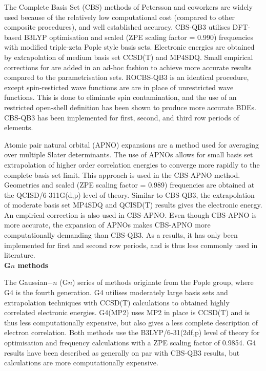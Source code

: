 The Complete Basis Set (CBS) methods of Petersson and coworkers\cite{Montgomery1999, Montgomery2000, Ochterski1996, Wood2006} are widely used because of the relatively low computational cost (compared to other composite procedures), and well established accuracy.\cite{Somers2015, Simmie2015} CBS-QB3\cite{Montgomery1999, Montgomery2000} utilises DFT-based B3LYP optimisation and scaled (ZPE scaling factor = 0.990) frequencies with modified triple-zeta Pople style basis sets. Electronic energies are obtained by extrapolation of medium basis set CCSD(T) and MP4SDQ. Small empirical corrections for are added in an ad-hoc fashion to achieve more accurate results compared to the parametrisation sets.\cite{Petersson2001} ROCBS-QB3 is an identical procedure, except spin-resticted wave functions are are in place of unrestricted wave functions. This is done to eliminate spin contamination, and the use of an restricted open-shell definition has been shown to produce more accurate BDEs.\cite{DiLabio1999} CBS-QB3 has been implemented for first, second, and third row periods of elements.

Atomic pair natural orbital (APNO) expansions are a method used for averaging over multiple Slater determinants. The use of APNOs allows for small basis set extrapolation of higher order correlation energies to converge more rapidly to the complete basis set limit. This approach is used in the CBS-APNO method.\cite{Ochterski1996} Geometries and scaled (ZPE scaling factor = 0.989) frequencies are obtained at the QCISD/6-311G(d,p) level of theory. Similar to CBS-QB3, the extrapolation of moderate basis set MP4SDQ and QCISD(T) results gives the electronic energy. An empirical correction is also used in CBS-APNO. Even though CBS-APNO is more accurate, the expansion of APNOs makes CBS-APNO more computationally demanding than CBS-QB3. As a results, it has only been implemented for first and second row periods, and is thus less commonly used in literature.
\\

\noindent \textbf{G$n$ methods}

The Gaussian$-n$ (G$n$) series of methods originate from the Pople group,\cite{Pople1989} where G4 is the fourth generation. G4 utilises moderately large basis sets and extrapolation techniques with CCSD(T) calculations to obtained highly correlated electronic energies. G4(MP2) uses MP2 in place is CCSD(T) and is thus less computationally expensive, but also gives a less complete description of electron correlation. Both methods use the B3LYP/6-31(2df,p) level of theory for optimisation and frequency calculations with a ZPE scaling factor of 0.9854. G4 results have been described as generally on par with CBS-QB3 results,\cite{Somers2015, Simmie2015} but calculations are more computationally expensive.

